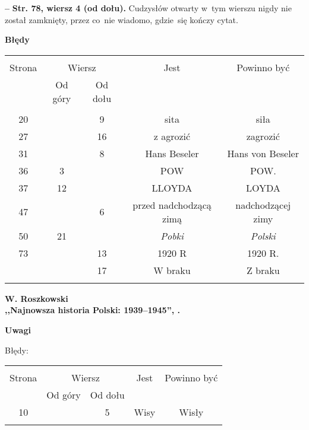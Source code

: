 \documentclass[a4paper,11pt]{article}
\newcommand{\spaceOne}{2em}
\newcommand{\tb}{\textbf}
\newcommand{\noi}{\noindent}
\newcommand{\start}{\noi \tb{--} {}}
\newcommand{\Center}[1]{\begin{center} #1 \end{center}}
\newcommand{\CenterTB}[1]{\Center{\tb{#1}}}
\newcommand{\StrWd}[2]{\tb{Str. #1, wiersz #2 (od dołu).}}
\newcommand{\Work}[1]{ \begin{center} {\large \tb{#1}} \end{center} }
\begin{document}
\start \StrWd{78}{4} Cudzysłów otwarty w~tym wierszu nigdy nie został
zamknięty, przez co~nie wiadomo, gdzie~się kończy cytat.

\CenterTB{Błędy}
\begin{center}
  \begin{tabular}{|c|c|c|c|c|}
    \hline
    & \multicolumn{2}{c|}{} & & \\
    Strona & \multicolumn{2}{c|}{Wiersz}& Jest & Powinno być \\ \cline{2-3}
    & Od góry & Od dołu &  &  \\ \hline
    & & & & \\
    20 & & 9 & sita & siła \\
    27 & & 16 & z agrozić & zagrozić \\
    31 & & 8 & Hans Beseler & Hans von Beseler \\
    36 & 3 & & POW & POW. \\
    37 & 12 & & LLOYDA & LOYDA \\
    47 & & 6 & przed nadchodzącą zimą & nadchodzącej zimy \\
    50 & 21 & & \emph{Pobki} & \emph{Polski} \\
    73 & & 13 & 1920 R & 1920 R. \\
    & & 17 & W braku & Z braku \\
    & & & & \\ \hline
  \end{tabular}
\end{center}

\vspace{\spaceOne}



\Work{
  W. Roszkowski \\
  ,,Najnowsza historia Polski: 1939--1945'', \cite{Ros11b}.}


\CenterTB{Uwagi}

Błędy:\\
\begin{center}
  \begin{tabular}{|c|c|c|c|c|}
    \hline
    & \multicolumn{2}{c|}{} & & \\
    Strona & \multicolumn{2}{c|}{Wiersz}& Jest & Powinno być \\ \cline{2-3}
    & Od góry & Od dołu &  &  \\ \hline
    10 & & 5 & Wisy & Wisły \\
    & & & & \\ \hline
  \end{tabular}
\end{center}
\end{document}
